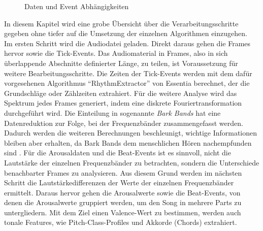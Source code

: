 \documentclass[11pt,a4paper]{article}
\begin{document}
\begin{wrapfigure}{r}{0.5\linewidth}
\captionsetup{justification=centering}
\caption[Daten und Event Abhängigkeiten]{Daten und Event Abhängigkeiten}
\end{wrapfigure}
\noindent
In diesem Kapitel wird eine grobe Übersicht über die Verarbeitungsschritte gegeben ohne tiefer auf die Umsetzung der einzelnen Algorithmen einzugehen.\\
Im ersten Schritt wird die Audiodatei geladen. Direkt daraus gehen die Frames hervor sowie die Tick-Events. Das Audiomaterial in Frames, also in sich überlappende Abschnitte definierter Länge, zu teilen, ist Voraussetzung für weitere Bearbeitungsschritte. Die Zeiten der Tick-Events werden mit dem dafür vorgesehenen Algorithmus ``RhythmExtractor'' von Essentia berechnet, der die Grundschläge oder Zählzeiten extrahiert. Für die weitere Analyse wird das Spektrum jedes Frames generiert, indem eine diskrete Fouriertransformation durchgeführt wird. Die Einteilung in sogenannte \textit{Bark Bands} hat eine Datenreduktion zur Folge, bei der Frequenzbänder zusammengefasst werden. Dadurch werden die weiteren Berechnungen beschleunigt, wichtige Informationen bleiben aber erhalten, da Bark Bands dem menschlichen Hören nachempfunden sind \cite[S. 80]{lerch2012introduction}. Für die Arousaldaten und die Beat-Events ist es sinnvoll, nicht die Lautstärke der einzelnen Frequenzbänder zu betrachten, sondern die Unterschiede benachbarter Frames zu analysieren. Aus diesem Grund werden im nächsten Schritt die Lautstärkedifferenzen der Werte der einzelnen Frequenzbänder ermittelt. Daraus hervor gehen die Arousalwerte sowie die Beat-Events, von denen die Arousalwerte gruppiert werden, um den Song in mehrere Parts zu untergliedern. Mit dem Ziel einen Valence-Wert zu bestimmen, werden auch tonale Features, wie Pitch-Class-Profiles und Akkorde (Chords) extrahiert.\\
\end{document}
